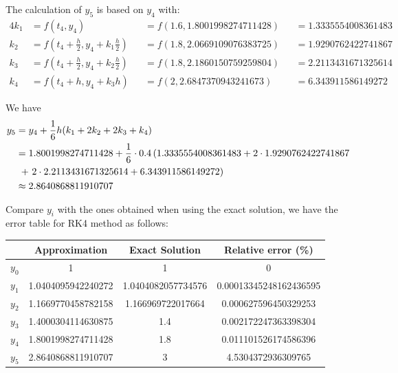 \documentclass[a4paper]{article}
\begin{document}
The calculation of \(y_5\) is based on \(y_4\) with:
\begin{alignat*}{4}
  k_1 & = f(t_4, y_4)                                            &  & = f(1.6, 1.8001998274711428) &  & = 1.3335554008361483 \\
  k_2 & = f \left(t_4 + \frac{h}{2}, y_4 + k_1\frac{h}{2}\right) &  & = f(1.8, 2.0669109076383725) &  & = 1.9290762422741867 \\
  k_3 & = f \left(t_4 + \frac{h}{2}, y_4 + k_2\frac{h}{2}\right) &  & = f(1.8, 2.1860150759259804) &  & = 2.2113431671325614 \\
  k_4 & = f(t_4 + h, y_4 + k_3h)                                 &  & = f(2, 2.6847370943241673)   &  & = 6.343911586149272
\end{alignat*}

We have
\begin{align*}
  y_5 & = y_4 + \frac{1}{6}h(k_1 + 2k_2 + 2k_3 + k_4)                                                            \\
      & = 1.8001998274711428 + \frac{1}{6} \cdot 0.4\left(1.3335554008361483 + 2 \cdot 1.9290762422741867\right. \\
      & \;\left.+\ 2 \cdot 2.2113431671325614 + 6.343911586149272\vphantom{1}\right)                             \\
      & \approx 2.8640868811910707
\end{align*}

Compare \(y_i\) with the ones obtained when using the exact solution, we have the error table for RK4 method as follows:

\begin{table}[H]
  \centering
  \begin{tabular}{@{}cS[table-format=1.16]S[table-format=1.16]S[table-format=1.20]@{}}
    \toprule
    {}      & {Approximation}    & {Exact Solution}   & {Relative error (\%)}  \\
    \midrule
    \(y_0\) & 1                  & 1                  & 0                      \\
    \(y_1\) & 1.0404095942240272 & 1.0404082057734576 & 0.00013345248162436595 \\
    \(y_2\) & 1.1669770458782158 & 1.166969722017664  & 0.000627596450329253   \\
    \(y_3\) & 1.4000304114630875 & 1.4                & 0.002172247363398304   \\
    \(y_4\) & 1.8001998274711428 & 1.8                & 0.011101526174586396   \\
    \(y_5\) & 2.8640868811910707 & 3                  & 4.5304372936309765     \\
    \bottomrule
  \end{tabular}
\end{table}
\end{document}
